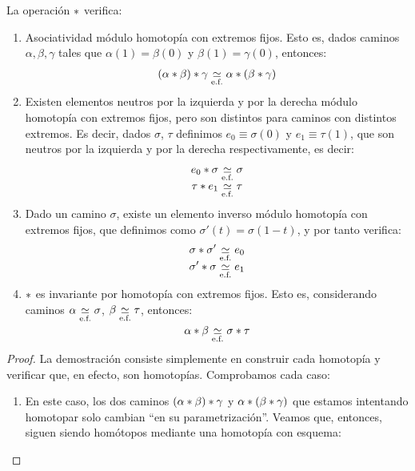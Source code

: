 \begin{lem}
	\label{grf_lema_prop_pathp}
	La operación ${\mathbin{*}}$ verifica:
	\begin{enumerate}
		\item Asociatividad módulo homotopía con extremos fijos. Esto es, dados caminos $\alpha,\beta,\gamma$ tales que $\alpha(1)=\beta(0)$ y $\beta(1)=\gamma(0)$, entonces:
		\[(\alpha\mathbin{*}\beta)\mathbin{*}\gamma\mathrel{\smash{\underset{\text{e.f.}}{\simeq}}}\alpha\mathbin{*}(\beta\mathbin{*}\gamma)\]
		
		\item Existen elementos neutros por la izquierda y por la derecha módulo homotopía con extremos fijos, pero son distintos para caminos con distintos extremos. Es decir, dados $\sigma$, $\tau$ definimos $e_0\equiv\sigma(0)$ y $e_1 \equiv\tau(1)$, que son neutros por la izquierda y por la derecha respectivamente, es decir:
		\begin{gather*}
			e_0\mathbin{*}\sigma \mathrel{\smash{\underset{\text{e.f.}}{\simeq}}} \sigma \\
			\tau\mathbin{*} e_1\mathrel{\smash{\underset{\text{e.f.}}{\simeq}}}\tau
		\end{gather*}
		
		\item Dado un camino $\sigma$, existe un elemento inverso módulo homotopía con extremos fijos, que definimos como $\sigma'(t)=\sigma(1-t)$, y por tanto verifica:
		\begin{gather*}
		\sigma\mathbin{*}\sigma' \mathrel{\smash{\underset{\text{e.f.}}{\simeq}}} e_0 \\
		\sigma'\mathbin{*}\sigma \mathrel{\smash{\underset{\text{e.f.}}{\simeq}}} e_1
		\end{gather*}
		
		\item ${\mathbin{*}}$ es invariante por homotopía con extremos fijos. Esto es, considerando caminos $\alpha\mathrel{\smash{\underset{\text{e.f.}}{\simeq}}}\sigma$, $\beta\mathrel{\smash{\underset{\text{e.f.}}{\simeq}}}\tau$, entonces:
		\[\alpha\mathbin{*}\beta\mathrel{\smash{\underset{\text{e.f.}}{\simeq}}} \sigma\mathbin{*}\tau\]
	\end{enumerate}

	\begin{proof}
		La demostración consiste simplemente en construir cada homotopía y verificar que, en efecto, son homotopías. Comprobamos cada caso:
		
		\begin{enumerate}
			\item En este caso, los dos caminos $(\alpha\mathbin{*}\beta)\mathbin{*}\gamma$ y $\alpha\mathbin{*}(\beta\mathbin{*}\gamma)$ que estamos intentando homotopar solo cambian ``en su parametrización''. Veamos que, entonces, siguen siendo homótopos mediante una homotopía con esquema:
			

\end{enumerate}
\end{proof}
\end{lem}
